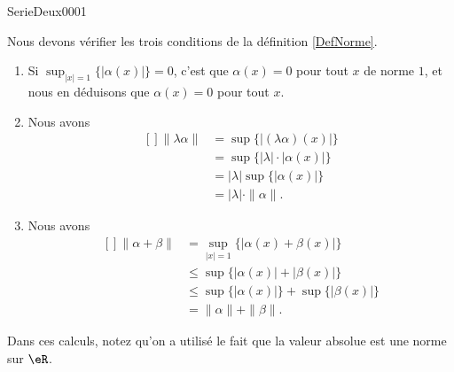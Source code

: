 
\begin{corrige}{SerieDeux0001}

    Nous devons vérifier les trois conditions de la définition \ref{DefNorme}.
	\begin{enumerate}

		\item
			Si $\sup_{| x |=1}\{ |\alpha(x)| \}=0$, c'est que $\alpha(x)=0$ pour tout $x$ de norme $1$, et nous en déduisons que $\alpha(x)=0$ pour tout $x$.
		\item
			Nous avons
			\begin{equation}
				\begin{aligned}[]
					\| \lambda\alpha \|&=\sup\{ | (\lambda\alpha)(x) | \}\\
					&=\sup\{ | \lambda |\cdot| \alpha(x) | \}\\
					&=| \lambda |\sup\{ | \alpha(x) | \}\\
					&=| \lambda |\cdot\| \alpha \|.
				\end{aligned}
			\end{equation}
		\item
			Nous avons
			\begin{equation}
				\begin{aligned}[]
					\| \alpha+\beta \|&=\sup_{| x |=1}\{ | \alpha(x)+\beta(x) | \}\\
					&\leq\sup \{ | \alpha(x) |+| \beta(x) | \}\\
					&\leq \sup\{ | \alpha(x) | \}+\sup\{ | \beta(x) | \}\\
					&=\| \alpha \|+\| \beta \|.
				\end{aligned}
			\end{equation}

	\end{enumerate}
	Dans ces calculs, notez qu'on a utilisé le fait que la valeur absolue est une norme sur $\eR$.

\end{corrige}
